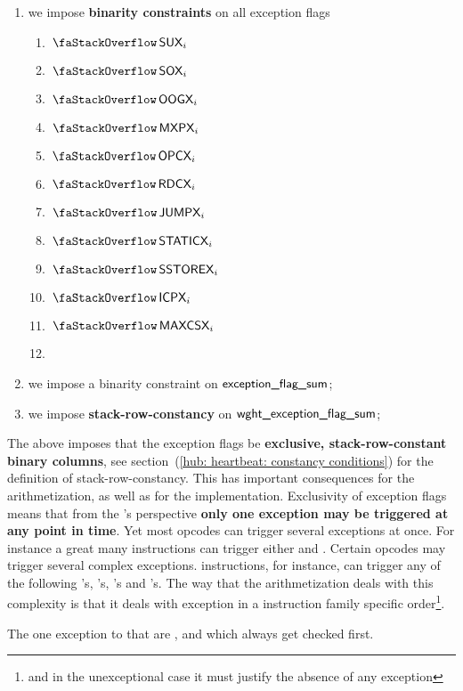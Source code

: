 \begin{enumerate}
	\item we impose \textbf{binarity constraints} on all exception flags
		\begin{multicols}{4}
			\begin{enumerate}
				\item $\stackSux_{i}$
				\item $\stackSox_{i}$
				\item $\stackOogx_{i}$
				\item $\stackMxpx_{i}$
				\item $\stackOpcx_{i}$
				\item $\stackRdcx_{i}$
				\item $\stackJumpx_{i}$
				\item $\stackStaticx_{i}$
				\item $\stackSstorex_{i}$
				\item $\stackIcpx_{i}$
				\item $\stackMaxcsx_{i}$
				\item[\vspace{\fill}]
			\end{enumerate}
		\end{multicols}
        \item we impose a binarity constraint on $\textsf{exception\_flag\_sum}$;
	\item we impose \textbf{stack-row-constancy} on $\textsf{wght\_}\textsf{exception\_flag\_sum}$;
\end{enumerate}

\saNote{} The above imposes that the exception flags be \textbf{exclusive, stack-row-constant binary columns}, see section~(\ref{hub: heartbeat: constancy conditions}) for the definition of stack-row-constancy.
This has important consequences for the arithmetization, as well as for the implementation.
Exclusivity of exception flags means that from the \zkEvm{}'s perspective \textbf{only one exception may be triggered at any point in time}.
Yet most \evm{} opcodes can trigger several exceptions at once.
For instance a great many instructions can trigger either \suxSH{} and \oogxSH{}.
Certain opcodes may trigger several complex exceptions.
 instructions, for instance, can trigger any of the following
\suxSH's,
\staticxSH's,
\mxpxSH's and
\oogxSH's.
The way that the arithmetization deals with this complexity is that it deals with exception in a instruction family specific order\footnote{and in the unexceptional case it must justify the absence of any exception}.

\saNote{} The one exception to that are \opcxSH{}, \suxSH{} and \soxSH{} which always get checked first.
